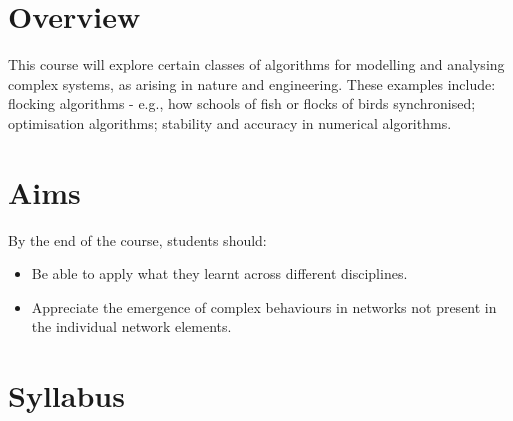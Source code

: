 \section*{Overview}

This course will explore certain classes of algorithms for modelling and
analysing complex systems, as arising in nature and engineering. These examples
include: flocking algorithms - e.g., how schools of fish or flocks of birds
synchronised; optimisation algorithms; stability and accuracy in numerical
algorithms.

\section*{Aims}

By the end of the course, students should:
\begin{itemize}
\item Be able to apply what they learnt across different disciplines.
\item Appreciate the emergence of complex behaviours in networks not present in
the individual network elements.
\end{itemize}

\section*{Syllabus}

